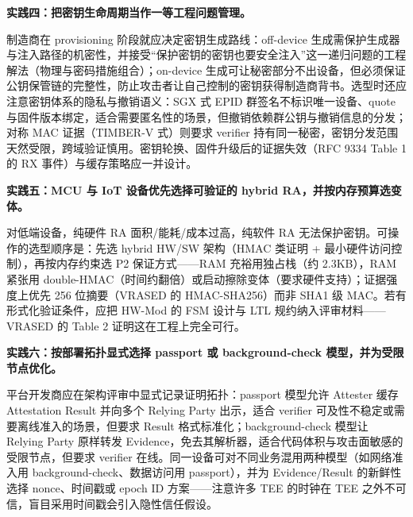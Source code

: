 \documentclass[11pt]{ctexart}
\begin{document}
\noindent\textbf{实践四：把密钥生命周期当作一等工程问题管理。}\par
制造商在 provisioning 阶段就应决定密钥生成路线：off-device 生成需保护生成器与注入路径的机密性，并接受“保护密钥的密钥也要安全注入”这一递归问题的工程解法（物理与密码措施组合）；on-device 生成可让秘密部分不出设备，但必须保证公钥保管链的完整性，防止攻击者让自己控制的密钥获得制造商背书\cite{rats_rfc}。选型时还应注意密钥体系的隐私与撤销语义：SGX 式 EPID 群签名不标识唯一设备、quote 与固件版本绑定，适合需要匿名性的场景，但撤销依赖群公钥与撤销信息的分发\cite{menetrey2022attestation}；对称 MAC 证据（TIMBER-V 式）则要求 verifier 持有同一秘密，密钥分发范围天然受限，跨域验证慎用。密钥轮换、固件升级后的证据失效（RFC 9334 Table 1 的 RX 事件）与缓存策略应一并设计。\par
\noindent\textbf{实践五：MCU 与 IoT 设备优先选择可验证的 hybrid RA，并按内存预算选变体。}\par
对低端设备，纯硬件 RA 面积/能耗/成本过高，纯软件 RA 无法保护密钥\cite{nunes2019vrased}。可操作的选型顺序是：先选 hybrid HW/SW 架构（HMAC 类证明 + 最小硬件访问控制），再按内存约束选 P2 保证方式——RAM 充裕用独占栈（约 2.3KB），RAM 紧张用 double-HMAC（时间约翻倍）或启动擦除变体（要求硬件支持）；证据强度上优先 256 位摘要（VRASED 的 HMAC-SHA256）而非 SHA1 级 MAC。若有形式化验证条件，应把 HW-Mod 的 FSM 设计与 LTL 规约纳入评审材料——VRASED 的 Table 2 证明这在工程上完全可行。\par
\noindent\textbf{实践六：按部署拓扑显式选择 passport 或 background-check 模型，并为受限节点优化。}\par
平台开发商应在架构评审中显式记录证明拓扑：passport 模型允许 Attester 缓存 Attestation Result 并向多个 Relying Party 出示，适合 verifier 可及性不稳定或需要离线准入的场景，但要求 Result 格式标准化；background-check 模型让 Relying Party 原样转发 Evidence，免去其解析器，适合代码体积与攻击面敏感的受限节点，但要求 verifier 在线\cite{rats_rfc}。同一设备可对不同业务混用两种模型（如网络准入用 background-check、数据访问用 passport），并为 Evidence/Result 的新鲜性选择 nonce、时间戳或 epoch ID 方案——注意许多 TEE 的时钟在 TEE 之外不可信，盲目采用时间戳会引入隐性信任假设。\par
\end{document}
